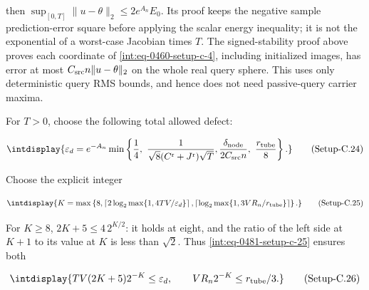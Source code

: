 
then \(\sup_{[0,\allowbreak T]}\|u-\theta\|_2\le2e^{A_n}E_0\). Its proof keeps the negative sample prediction-error square before applying the scalar energy inequality; it is not the exponential of a worst-case Jacobian times \(T\). The signed-stability proof above proves each coordinate of \hyperref[int:eq-setup-c-4]{\eqref{int:eq-0460-setup-c-4}}, including initialized images, has error at most \(C_{\rm src}n\|u-\theta\|_2\) on the whole real query sphere. This uses only deterministic query RMS bounds, and hence does not need passive-query carrier maxima.



For \(T>0\), choose the following total allowed defect:


\label{int:eq-setup-c-24}
\begingroup\renewcommand{\theHequation}{intdisplay.953}
\begin{equation}
\intdisplay{
\varepsilon_d=e^{-A_n}\min\left\{
\frac14,\ \frac1{\sqrt8(C^{\rm r}+J^{\rm r})\sqrt T},
\frac{\delta_{\rm node}}{2C_{\rm src}n},\ \frac{r_{\rm tube}}{8}\right\}.
}
\tag{Setup-C.24}
\label{int:eq-0480-setup-c-24}
\end{equation}
\endgroup


Choose the explicit integer


\label{int:eq-setup-c-25}
\begingroup\renewcommand{\theHequation}{intdisplay.954}
\begin{equation}
\intdisplay{
K=\max\left\{8,
\left\lceil2\log_2\max\{1,4TV/\varepsilon_d\}\right\rceil,
\left\lceil\log_2\max\{1,3VR_n/r_{\rm tube}\}\right\rceil\right\}.
}
\tag{Setup-C.25}
\label{int:eq-0481-setup-c-25}
\end{equation}
\endgroup


For \(K\ge8\), \(2K+5\le4\,\allowbreak 2^{K/2}\): it holds at eight, and the ratio of the left side at \(K+1\) to its value at \(K\) is less than \(\sqrt2\). Thus \hyperref[int:eq-setup-c-25]{\eqref{int:eq-0481-setup-c-25}} ensures both


\label{int:eq-setup-c-26}
\begingroup\renewcommand{\theHequation}{intdisplay.955}
\begin{equation}
\intdisplay{
TV(2K+5)2^{-K}\le\varepsilon_d,
\qquad VR_n2^{-K}\le r_{\rm tube}/3.
}
\tag{Setup-C.26}
\label{int:eq-0482-setup-c-26}
\end{equation}
\endgroup

